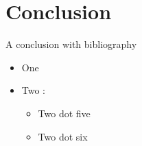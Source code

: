 \section{Conclusion}
\begin{frame}{A conclusion with bibliography}
  

      \begin{itemize}
      \Large
      \item<1-> One
      \item<2-> Two :\begin{itemize}
          \large
                  \item Two dot five
                  \item Two dot six
                \end{itemize}
      \end{itemize}




\end{frame}

\maketitle
